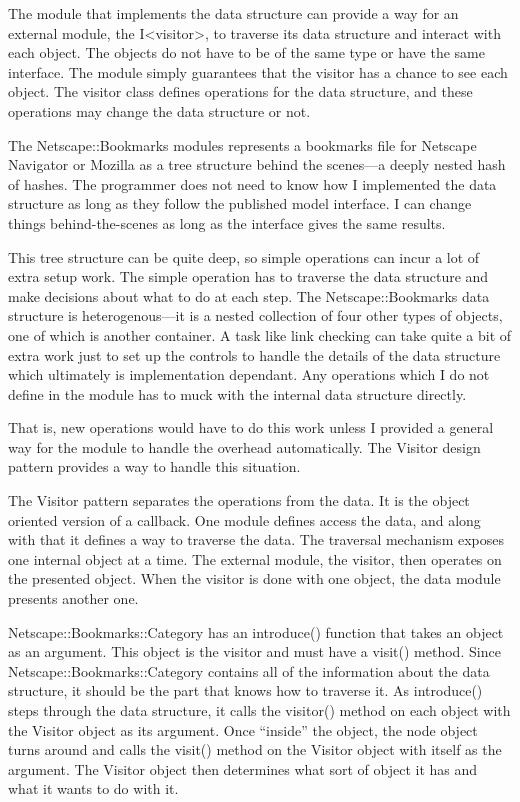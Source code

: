 The module that implements the data structure can provide a
way for an external module, the I<visitor>, to traverse its
data structure and interact with each object. The objects do
not have to be of the same type or have the same interface. 
The module simply guarantees that the visitor has a chance
to see each object. The visitor class defines operations for
the data structure, and these operations may change the data
structure or not.

The Netscape::Bookmarks modules represents a bookmarks file
for Netscape Navigator or Mozilla as a tree structure behind
the scenes---a deeply nested hash of hashes. The programmer
does not need to know how I implemented the data structure
as long as they follow the published model interface.  I can
change things behind-the-scenes as long as the interface
gives the same results.

This tree structure can be quite deep, so simple operations
can incur a lot of extra setup work.  The simple operation
has to traverse the data structure and make decisions about
what to do at each step.  The Netscape::Bookmarks data
structure is heterogenous---it is a nested collection of
four other types of objects, one of which is another
container. A task like link checking
can take quite a bit of extra work just to set up the
controls to handle the details of the data structure which
ultimately is implementation dependant.  Any operations
which I do not define in the module has to muck with
the internal data structure directly.  

That is, new operations would have to do this work unless I
provided a general way for the module to handle the overhead
automatically.  The Visitor design pattern provides a way to
handle this situation.

The Visitor pattern separates the operations from the
data.  It is the object oriented version of a callback.
One module defines access the data, and along
with that it defines a way to traverse the data.  The
traversal mechanism exposes one internal object at a 
time.  The external module, the visitor, then operates
on the presented object.  When the visitor is done with
one object, the data module presents another one. 



Netscape::Bookmarks::Category has an introduce()
function that takes an object as an argument. This object is
the visitor and must have a visit() method.  Since
Netscape::Bookmarks::Category contains all of the
information about the data structure, it
should be the part that knows how to traverse it.  As
introduce() steps through the data structure, it calls the
visitor() method on each object with the Visitor object as
its argument.  Once ``inside'' the object, the node object
turns around and calls the visit() method on the Visitor
object with itself as the argument.  The Visitor object then
determines what sort of object it has and what it wants to
do with it.

